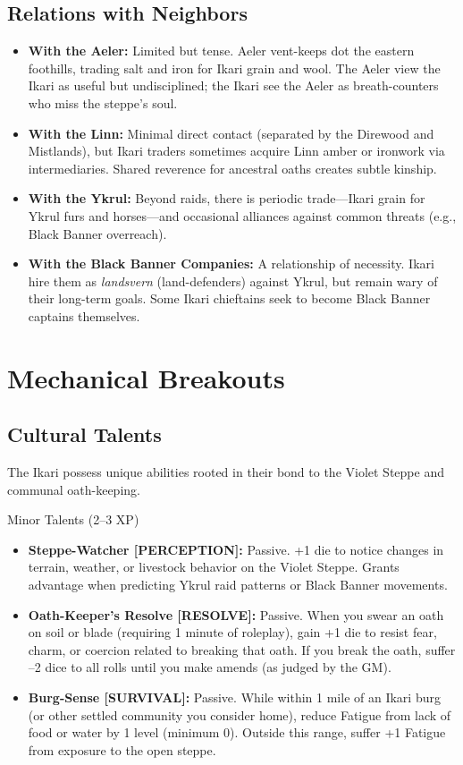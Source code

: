 \documentclass[12pt]{article}
\begin{document}
\subsection{Relations with Neighbors}
\begin{itemize}[leftmargin=*]
  \item \textbf{With the Aeler:} Limited but tense. Aeler vent-keeps dot the eastern foothills, trading salt and iron for Ikari grain and wool. The Aeler view the Ikari as useful but undisciplined; the Ikari see the Aeler as breath-counters who miss the steppe's soul.
  \item \textbf{With the Linn:} Minimal direct contact (separated by the Direwood and Mistlands), but Ikari traders sometimes acquire Linn amber or ironwork via intermediaries. Shared reverence for ancestral oaths creates subtle kinship.
  \item \textbf{With the Ykrul:} Beyond raids, there is periodic trade---Ikari grain for Ykrul furs and horses---and occasional alliances against common threats (e.g., Black Banner overreach).
  \item \textbf{With the Black Banner Companies:} A relationship of necessity. Ikari hire them as \textit{landsvern} (land-defenders) against Ykrul, but remain wary of their long-term goals. Some Ikari chieftains seek to become Black Banner captains themselves.
\end{itemize}

\section{Mechanical Breakouts}

\subsection{Cultural Talents}
The Ikari possess unique abilities rooted in their bond to the Violet Steppe and communal oath-keeping.

\begin{mechanic}{Minor Talents (2--3 XP)}
  \begin{itemize}[leftmargin=*]
    \item \textbf{Steppe-Watcher [PERCEPTION]:} Passive. +1 die to notice changes in terrain, weather, or livestock behavior on the Violet Steppe. Grants advantage when predicting Ykrul raid patterns or Black Banner movements.
    \item \textbf{Oath-Keeper's Resolve [RESOLVE]:} Passive. When you swear an oath on soil or blade (requiring 1 minute of roleplay), gain +1 die to resist fear, charm, or coercion related to breaking that oath. If you break the oath, suffer --2 dice to all rolls until you make amends (as judged by the GM).
    \item \textbf{Burg-Sense [SURVIVAL]:} Passive. While within 1 mile of an Ikari burg (or other settled community you consider home), reduce Fatigue from lack of food or water by 1 level (minimum 0). Outside this range, suffer +1 Fatigue from exposure to the open steppe.
  \end{itemize}
\end{mechanic}
\end{document}
